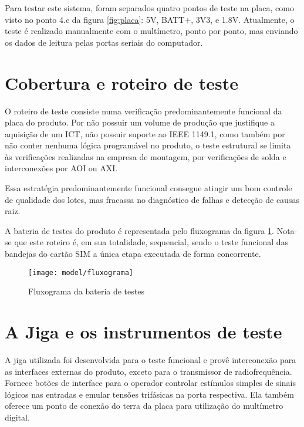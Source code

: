         Para testar este sistema, foram separados quatro pontos de teste na placa, como visto no ponto 4.c da figura \ref{fig:placa}: 5V, BATT+, 3V3, e 1.8V. Atualmente, o teste é realizado manualmente com o multímetro, ponto por ponto, mas enviando os dados de leitura pelas portas seriais do computador. 
                
\section{Cobertura e roteiro de teste}
        
    O roteiro de teste consiste numa verificação predominantemente funcional da placa do produto. Por não possuir um volume de produção que justifique a aquisição de um ICT, não possuir suporte ao IEEE 1149.1, como também por não conter nenhuma lógica programável no produto, o teste estrutural se limita às verificações realizadas na empresa de montagem, por verificações de solda e interconexões por AOI ou AXI. 
        
    Essa estratégia predominantemente funcional consegue atingir um bom controle de qualidade dos lotes, mas fracassa no diagnóstico de falhas e detecção de causas raiz. 

    A bateria de testes do produto é representada pelo fluxograma da figura \ref{fig:flowchart}. Nota-se que este roteiro é, em sua totalidade, sequencial, sendo o teste funcional das bandejas do cartão SIM a única etapa executada de forma concorrente. 
    
    \begin{figure}[h]
        \centering
        \texttt{[image: model/fluxograma]}
        \caption{Fluxograma da bateria de testes}
        \label{fig:flowchart}
    \end{figure} 
   
\section{A Jiga e os instrumentos de teste}
        
    A jiga utilizada foi desenvolvida para o teste funcional e provê interconexão para as interfaces externas do produto, exceto para o transmissor de radiofrequência. Fornece botões de interface para o operador controlar estímulos simples de sinais lógicos nas entradas e emular tensões trifásicas na porta respectiva. Ela também oferece um ponto de conexão do terra da placa para utilização do multímetro digital.
    
